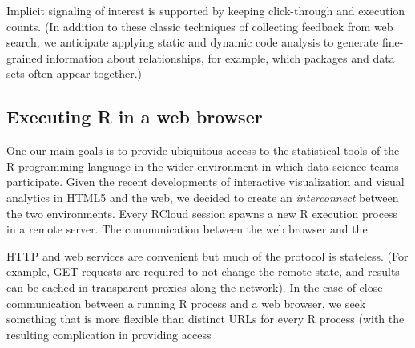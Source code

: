 Implicit signaling of interest is supported by keeping click-through
\cite{Joachims:2005:AIC} and execution counts. (In addition to these
classic techniques of collecting feedback from web search, we anticipate
applying static and dynamic code analysis to generate fine-grained
information about relationships, for example, which packages and data
sets often appear together.)

\subsection{Executing R in a web browser}

One our main goals is to provide ubiquitous access to the statistical
tools of the R programming language in the wider environment in which data
science teams participate.
%
Given the recent developments of interactive visualization and visual
analytics in HTML5 and the web, we decided to create an
\emph{interconnect} between the two environments.
%
Every RCloud session spawns a new R execution process in a remote
server. The communication between the web browser and the 


HTTP and web services are convenient but much of the protocol is
stateless. (For example, GET requests are required to not change the
remote state, and results can be cached in transparent proxies along
the network). In the case of close communication between a running
R process and a web browser, we seek something that is more flexible
than distinct URLs for every R process (with the resulting
complication in providing access 








